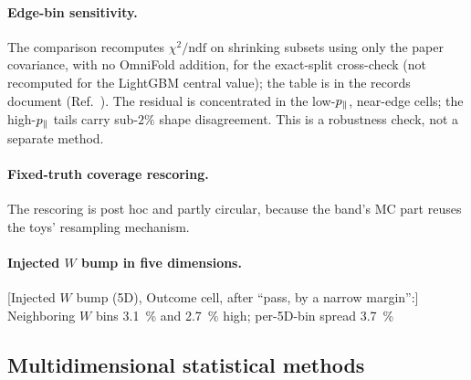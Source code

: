 \paragraph{Edge-bin sensitivity.} The comparison recomputes $\chi^{2}/\mathrm{ndf}$ on shrinking subsets using only the paper covariance, with no OmniFold addition, for the exact-split cross-check (not recomputed for the LightGBM central value); the table is in the records document (Ref.~\cite{NoteRecords2026}). The residual is concentrated in the low-$p_{\parallel}$, near-edge cells; the high-$p_{\parallel}$ tails carry sub-$2\%$ shape disagreement. This is a robustness check, not a separate method.

\paragraph{Fixed-truth coverage rescoring.} The rescoring is post hoc and partly circular, because the band's MC part reuses the toys' resampling mechanism.

\paragraph{Injected $W$ bump in five dimensions.} [Injected $W$ bump (5D), Outcome cell, after ``pass, by a narrow margin'':] Neighboring $W$ bins \SI{3.1}{\percent} and \SI{2.7}{\percent} high; per-5D-bin spread \SI{3.7}{\percent}

\subsection{Multidimensional statistical methods}\label{recsec:methods-nd}

